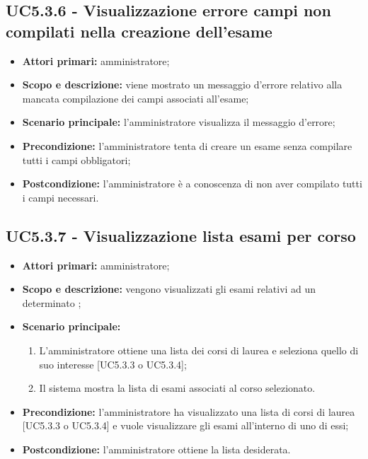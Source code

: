 \documentclass[AnalisiDeiRequisiti.tex]{subfiles}
\begin{document}
\subsection{UC5.3.6 - Visualizzazione errore campi non compilati nella creazione dell'esame}
\begin{itemize}
	\item \textbf{Attori primari:} amministratore;
	\item \textbf{Scopo e descrizione:} viene mostrato un messaggio d'errore relativo alla mancata compilazione dei campi associati all'esame;
	\item \textbf{Scenario principale:} l'amministratore visualizza il messaggio d'errore;
	\item \textbf{Precondizione:} l'amministratore tenta di creare un esame senza compilare tutti i campi obbligatori; 
	\item \textbf{Postcondizione:} l'amministratore è a conoscenza di non aver compilato tutti i campi necessari.
\end{itemize}
\subsection{UC5.3.7 - Visualizzazione lista esami per corso}
\begin{itemize}
	\item \textbf{Attori primari:} amministratore;
	\item \textbf{Scopo e descrizione:} vengono visualizzati gli esami relativi ad un determinato ;
	\item \textbf{Scenario principale:}
	\begin{enumerate}
		\item L'amministratore ottiene una lista dei corsi di laurea e seleziona quello di suo interesse [UC5.3.3 o UC5.3.4];
		\item Il sistema mostra la lista di esami associati al corso selezionato.
	\end{enumerate}
	\item \textbf{Precondizione:} l'amministratore ha visualizzato una lista di corsi di laurea [UC5.3.3 o UC5.3.4] e vuole visualizzare gli esami all'interno di uno di essi; 
	\item \textbf{Postcondizione:} l'amministratore ottiene la lista desiderata.
\end{itemize}
\end{document}
